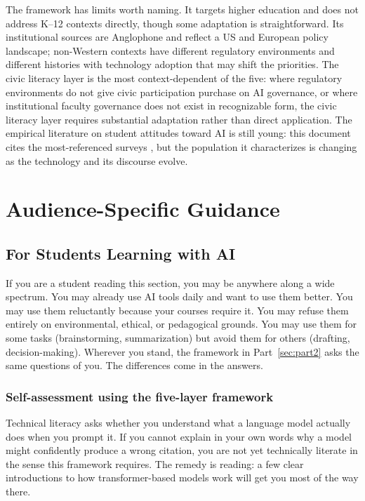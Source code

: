 \documentclass[12pt]{article}
\begin{document}
The framework has limits worth naming. It targets higher education and does not address K--12 contexts directly, though some adaptation is straightforward. Its institutional sources are Anglophone and reflect a US and European policy landscape; non-Western contexts have different regulatory environments and different histories with technology adoption that may shift the priorities. The civic literacy layer is the most context-dependent of the five: where regulatory environments do not give civic participation purchase on AI governance, or where institutional faculty governance does not exist in recognizable form, the civic literacy layer requires substantial adaptation rather than direct application. The empirical literature on student attitudes toward AI is still young: this document cites the most-referenced surveys \autocite[among others]{chanhu2023students}, but the population it characterizes is changing as the technology and its discourse evolve.

\section{Audience-Specific Guidance}
\label{sec:part3}

\subsection{For Students Learning with AI}
\label{sec:III.1}

If you are a student reading this section, you may be anywhere along a wide spectrum. You may already use AI tools daily and want to use them better. You may use them reluctantly because your courses require it. You may refuse them entirely on environmental, ethical, or pedagogical grounds. You may use them for some tasks (brainstorming, summarization) but avoid them for others (drafting, decision-making). Wherever you stand, the framework in Part~\ref{sec:part2} asks the same questions of you. The differences come in the answers.

\subsubsection*{Self-assessment using the five-layer framework}

Technical literacy asks whether you understand what a language model actually does when you prompt it. If you cannot explain in your own words why a model might confidently produce a wrong citation, you are not yet technically literate in the sense this framework requires. The remedy is reading: a few clear introductions to how transformer-based models work will get you most of the way there.
\end{document}
